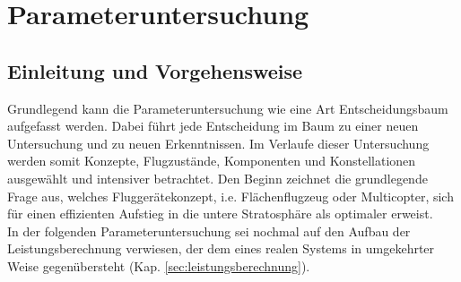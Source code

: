 \chapter{Parameteruntersuchung}
\label{chap:parameteruntersuchung}

\section{Einleitung und Vorgehensweise}
\label{sec:einleitung_und_vorgehensweise}
Grundlegend kann die Parameteruntersuchung wie eine Art Entscheidungsbaum aufgefasst werden. Dabei führt jede Entscheidung im Baum zu einer neuen Untersuchung und zu neuen Erkenntnissen. Im Verlaufe dieser Untersuchung werden somit Konzepte, Flugzustände, Komponenten und Konstellationen ausgewählt und intensiver betrachtet. Den Beginn zeichnet die grundlegende Frage aus, welches Fluggerätekonzept, i.e. Flächenflugzeug oder Multicopter, sich für einen effizienten Aufstieg in die untere Stratosphäre als optimaler erweist. \\
In der folgenden Parameteruntersuchung sei nochmal auf den Aufbau der Leistungsberechnung verwiesen, der dem eines realen Systems in umgekehrter Weise gegenübersteht (Kap. \ref{sec:leistungsberechnung}).

